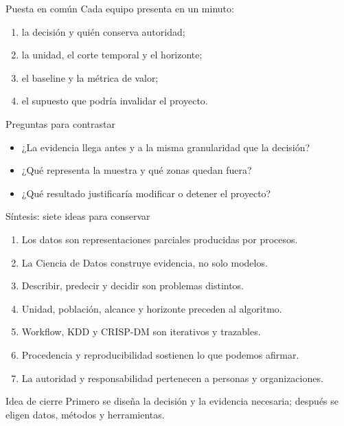 \documentclass[aspectratio=169,11pt]{beamer}
\begin{document}
\begin{frame}{Puesta en común}
  Cada equipo presenta en un minuto:
  \begin{enumerate}
    \item la decisión y quién conserva autoridad;
    \item la unidad, el corte temporal y el horizonte;
    \item el baseline y la métrica de valor;
    \item el supuesto que podría invalidar el proyecto.
  \end{enumerate}
  \vspace{0.5em}
  \begin{block}{Preguntas para contrastar}
    \begin{itemize}
      \item ¿La evidencia llega antes y a la misma granularidad que la decisión?
      \item ¿Qué representa la muestra y qué zonas quedan fuera?
      \item ¿Qué resultado justificaría modificar o detener el proyecto?
    \end{itemize}
  \end{block}
\end{frame}

\begin{frame}{Síntesis: siete ideas para conservar}
  \begin{enumerate}
    \item Los datos son representaciones parciales producidas por procesos.
    \item La Ciencia de Datos construye evidencia, no solo modelos.
    \item Describir, predecir y decidir son problemas distintos.
    \item Unidad, población, alcance y horizonte preceden al algoritmo.
    \item Workflow, KDD y CRISP-DM son iterativos y trazables.
    \item Procedencia y reproducibilidad sostienen lo que podemos afirmar.
    \item La autoridad y responsabilidad pertenecen a personas y organizaciones.
  \end{enumerate}
  \vfill
  \begin{block}{Idea de cierre}
    Primero se diseña la decisión y la evidencia necesaria; después se eligen datos, métodos y herramientas.
  \end{block}
\end{frame}
\end{document}
